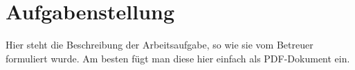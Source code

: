 

\section*{Aufgabenstellung}
Hier steht die Beschreibung der Arbeitsaufgabe, so wie sie vom Betreuer formuliert wurde. Am besten fügt man diese hier einfach als PDF-Dokument ein.

%
